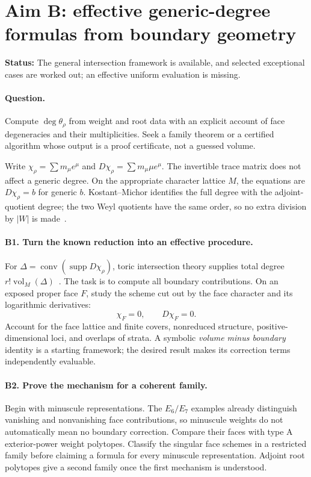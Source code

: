 \documentclass[11pt,letterpaper]{article}
\newcommand{\status}[1]{\noindent\textbf{Status:} #1\par}
\begin{document}
\newpage
\section{Aim B: effective generic-degree formulas from boundary geometry}
\status{The general intersection framework is available, and selected
exceptional cases are worked out; an effective uniform evaluation is missing.}

\paragraph{Question.}
Compute \(\deg\theta_\rho\) from weight and root data with an explicit account
of face degeneracies and their multiplicities. Seek a family theorem or a
certified algorithm whose output is a proof certificate, not a guessed volume.

Write \(\chi_\rho=\sum m_\mu e^\mu\) and
\(D\chi_\rho=\sum m_\mu\mu e^\mu\).
The invertible trace matrix does not affect a generic degree. On the
appropriate character lattice \(M\), the equations are
\(D\chi_\rho=b\) for generic \(b\).
Kostant--Michor identifies the full degree with the adjoint-quotient degree;
the two Weyl quotients have the same order, so no extra division by \(|W|\)
is made~\cite{KM}.

\paragraph{B1. Turn the known reduction into an effective procedure.}
For \(\Delta=\operatorname{conv}(\operatorname{supp}D\chi_\rho)\),
toric intersection theory supplies total degree
\(r!\operatorname{vol}_M(\Delta)\)~\cite{FS}.
The task is to compute all boundary contributions. On an exposed proper
face \(F\), study the scheme cut out by the face character and its
logarithmic derivatives:
\[
 \chi_F=0,\qquad D\chi_F=0.
\]
Account for the face lattice and finite covers, nonreduced structure,
positive-dimensional loci, and overlaps of strata. A symbolic
\emph{volume minus boundary} identity is a starting framework; the desired
result makes its correction terms independently evaluable.

\paragraph{B2. Prove the mechanism for a coherent family.}
Begin with minuscule representations. The \(E_6/E_7\) examples already
distinguish vanishing and nonvanishing face contributions, so
minuscule weights do not automatically mean no boundary correction.
Compare their faces with type A exterior-power weight polytopes.
Classify the singular face schemes in a restricted family before claiming
a formula for every minuscule representation. Adjoint root polytopes give
a second family once the first mechanism is understood.
\end{document}
